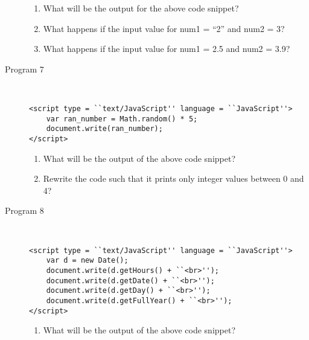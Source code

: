 \documentclass[11pt,a4paper]{article}
\def\AnswerBox{\fbox{\begin{minipage}{4in}\hfill\vspace{0.5in}\end{minipage}}}
\begin{document}
\begin{description}
\AnswerBox

\begin{enumerate}[label=\bfseries Q\arabic*:]\itemsep10pt
\item What will be the output for the above code snippet?
\item What happens if the input value for num1 = ``2'' and num2 = 3?
\item What happens if the input value for num1 = 2.5 and num2 = 3.9?
\end{enumerate}

\item [Program 7]\
\begin{lstlisting}
<script type = ``text/JavaScript'' language = ``JavaScript''>
    var ran_number = Math.random() * 5;
    document.write(ran_number); 
</script>
\end{lstlisting}
\AnswerBox

\begin{enumerate}[label=\bfseries Q\arabic*:]\itemsep10pt
\item What will be the output of the above code snippet?
\item Rewrite the code such that it prints only integer values between 0 and 4?
\end{enumerate}

\item [Program 8]\
\begin{lstlisting}
<script type = ``text/JavaScript'' language = ``JavaScript''>
    var d = new Date();
    document.write(d.getHours() + ``<br>'');
    document.write(d.getDate() + ``<br>'');
    document.write(d.getDay() + ``<br>'');
    document.write(d.getFullYear() + ``<br>'');
</script>
\end{lstlisting}
\AnswerBox

\begin{enumerate}[label=\bfseries Q\arabic*:]\itemsep10pt
\item What will be the output of the above code snippet?
\end{enumerate}
\end{description}
\end{document}
